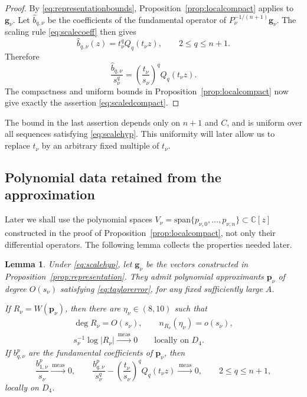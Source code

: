 \documentclass[12pt,letterpaper,reqno]{amsart}
\newtheorem{lem}[thm]{Lemma}
\theoremstyle{definition}
\numberwithin{equation}{section}
\newcommand{\C}{\mathbb C}
\newcommand{\convmeas}{\xrightarrow{\,\mathrm{meas}\,}}
\newcommand{\gv}{\bm g}
\newcommand{\pv}{\bm p}
\begin{document}
\begin{proof}
By \eqref{eq:representationbounds},
Proposition~\ref{prop:localcompact} applies to \(\gv_\nu\). Let
\(\widehat b_{q,\nu}\) be the coefficients of the fundamental operator
of \(P_\nu^{-1/(n+1)}\gv_\nu\). The scaling rule
\eqref{eq:scalecoeff} then gives
\begin{equation}\label{eq:canonical-coefficient-identification}
 \widehat b_{q,\nu}(z)
 =
 t_\nu^qQ_q(t_\nu z),
 \qquad
 2\leq q\leq n+1.
\end{equation}
Therefore
\[
 \frac{\widehat b_{q,\nu}}{s_\nu^q}
 =
 \left(\frac{t_\nu}{s_\nu}\right)^qQ_q(t_\nu z).
\]
The compactness and uniform bounds in
Proposition~\ref{prop:localcompact} now give exactly the assertion
\eqref{eq:scaledcompact}.
\end{proof}

The bound in the last assertion depends only on \({n+1}\) and \(C\), and
is uniform over all sequences satisfying \eqref{eq:scalehyp}. This
uniformity will later allow us to replace \(t_\nu\) by an arbitrary
fixed multiple of \(t_\nu\).


\subsection{Polynomial data retained from the approximation}
\label{sec:replacement}

Later we shall use the polynomial spaces
$V_\nu={\mathrm{span}}\{ p_{\nu,0},\dots,p_{\nu,n}\}\subset\C[z]$
constructed in the proof of
Proposition~\ref{prop:localcompact}, not only their differential
operators. The following lemma collects the properties needed later.
\begin{lem}\label{lem:replacement}
Under \eqref{eq:scalehyp}, let \(\gv_\nu\) be the vectors constructed
in Proposition~\ref{prop:representation}. They admit polynomial
approximants \(\pv_\nu\) of degree \(O(s_\nu)\) satisfying
\eqref{eq:taylorerror}, for any fixed sufficiently large \(A\).

If \(R_\nu=W(\pv_\nu)\), then there are
\(\eta_\nu\in(8,10)\) such that
\begin{equation}\label{eq:replacement-data}
 \begin{gathered}
 \deg R_\nu=O(s_\nu),
 \qquad
 n_{R_\nu}(\eta_\nu)=o(s_\nu),\\
 s_\nu^{-1}\log|R_\nu|
 \convmeas0
 \qquad\text{locally on }D_4.
 \end{gathered}
\end{equation}
If \(b_{q,\nu}^p\) are the fundamental coefficients of \(\pv_\nu\),
then
\begin{equation}\label{eq:polynomial-coefficients}
 \frac{b_{1,\nu}^p}{s_\nu}
\convmeas0,
 \qquad
 \frac{b_{q,\nu}^p}{s_\nu^q}
 -
 \left(\frac{t_\nu}{s_\nu}\right)^qQ_q(t_\nu z)
 \convmeas0,
 \qquad
 2\leq q\leq n+1,
\end{equation}
locally on \(D_4\).
\end{lem}
\end{document}
